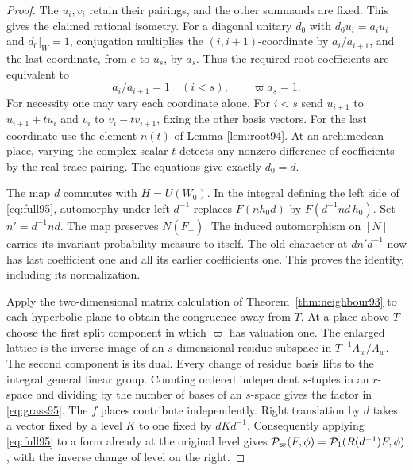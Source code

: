 \documentclass[a4paper,11pt]{article}
\theoremstyle{definition}
\theoremstyle{remark}
\numberwithin{equation}{section}
\begin{document}
\begin{proof}
The \(u_i,v_i\) retain their pairings, and the other summands are
fixed. This gives the claimed rational isometry. For a diagonal
unitary \(d_0\) with \(d_0u_i=a_i u_i\) and \(d_0|_W=1\),
conjugation multiplies the \((i,i+1)\)-coordinate by
\(a_i/a_{i+1}\), and the last coordinate, from \(e\) to \(u_s\),
by \(a_s\). Thus the required root coefficients are equivalent to
\[
              a_i/a_{i+1}=1\quad(i<s),\qquad \varpi a_s=1 .
\]
For necessity one may vary each coordinate alone. For \(i<s\)
send \(u_{i+1}\) to \(u_{i+1}+t u_i\) and \(v_i\) to
\(v_i-\bar t v_{i+1}\), fixing the other basis vectors. For the
last coordinate use the element \(n(t)\) of Lemma \ref{lem:root94}.
At an archimedean place, varying the complex scalar \(t\) detects
any nonzero difference of coefficients by the real trace pairing.
The equations give exactly \(d_0=d\).

The map \(d\) commutes with \(H=U(W_0)\). In the integral defining
the left side of \eqref{eq:full95}, automorphy under left
\(d^{-1}\) replaces \(F(nh_0d)\) by \(F(d^{-1}nd\,h_0)\).
Set \(n'=d^{-1}nd\). The map preserves \(N(F_+)\). The induced
automorphism on \([N]\) carries its invariant probability measure to
itself. The old character at \(dn'd^{-1}\) now has last coefficient
one and all its earlier coefficients one. This proves the identity,
including its normalization.

Apply the two-dimensional matrix calculation of
Theorem~\ref{thm:neighbour93} to each hyperbolic plane to obtain
the congruence away from \(T\). At a place above \(T\) choose the
first split component in which \(\varpi\) has valuation one.
The enlarged lattice is the inverse image of an \(s\)-dimensional
residue subspace in \(T^{-1}\Lambda_w/\Lambda_w\). The second
component is its dual. Every change of residue basis lifts to the
integral general linear group. Counting ordered independent
\(s\)-tuples in an \(r\)-space and dividing by the number of bases
of an \(s\)-space gives the factor in \eqref{eq:grass95}.
The \(f\) places contribute independently. Right translation by
\(d\) takes a vector fixed by a level \(K\) to one fixed by
\(dKd^{-1}\). Consequently applying \eqref{eq:full95} to a form
already at the original level gives
\({\cal P}_{\varpi}(F,\phi)={\cal P}_1(R(d^{-1})F,\phi)\),
with the inverse change of level on the right.
\end{proof}
\end{document}
